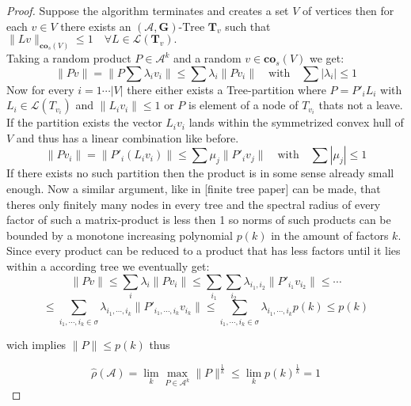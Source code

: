 \begin{proof}
Suppose the algorithm terminates and creates a set $V$ of vertices then for each $v \in V$ there exists an $(\mathcal{A},\mathbf{G})\text{-Tree } \mathbf{T}_{v}$ such that $\lVert Lv \rVert_{\mathbf{co}_s (V)} \leq 1 \quad \forall L \in \mathcal{L}(\mathbf{T}_{v}).$ \\
Taking a random product $P \in \mathcal{A}^k$ and a random $v \in \mathbf{co}_s(V)$
we get:
$$\lVert Pv \rVert = \lVert P \sum \lambda_i v_i \rVert \leq \sum \lambda_i \lVert P v_i \rVert \quad \text{with} \quad \sum |\lambda_i| \leq 1$$
Now for every $i = 1 \cdots \lvert V \rvert$ there either exists a Tree-partition where $P = P'_i L_i $ with $L_i \in \mathcal{L}(T_{v_i})$ and $\lVert L_i v_i \rVert \leq 1$ or $P$ is element of a node of $T_{v_i}$ thats not a leave. If the partition exists the vector $L_iv_i$ lands within the symmetrized convex hull of $V$ and thus has a linear combination like before. \\
$$ \lVert P v_i \rVert = \lVert P'_i (L_i v_i) \rVert \leq \sum \mu_j \lVert P'_i v_j \rVert \quad \text{with} \quad \sum |\mu_j| \leq 1 $$
If there exists no such partition then the product is in some sense already small enough. Now a similar argument, like in [finite tree paper] can be made, that theres only finitely many nodes in every tree and the spectral radius of every factor of such a matrix-product is less then 1 so norms of such products can be bounded by a monotone increasing polynomial $p(k)$ in the amount of factors $k$. \\
Since every product can be reduced to a product that has less factors until it lies within a according tree we eventually get:
$$ \lVert Pv \rVert \leq \sum \limits_{i} \lambda_i \lVert P v_i \rVert \leq \sum\limits_{i_1}\sum\limits_{i_2}\lambda_{i_1,i_2} \lVert P'_{i_1} v_{i_2} \rVert \leq \cdots $$
$$  \leq \sum \limits_{i_1,\cdots,i_k \in \sigma} \lambda_{i_1,\cdots,i_k} \lVert P'_{i_1,\cdots,i_k}v_{i_k} \rVert \leq \sum \limits_{i_1,\cdots,i_k \in \sigma} \lambda_{i_1,\cdots,i_k} p(k) \leq p(k)$$

wich implies $\lVert P \rVert \leq p(k)$ thus

$$\hat{\rho}(\mathcal{A}) = \lim_k \max_{P \in \mathcal{A}^k} \lVert P \rVert ^{\frac{1}{k}} \leq \lim_k p(k) ^{\frac{1}{k}}  = 1$$
\end{proof}

